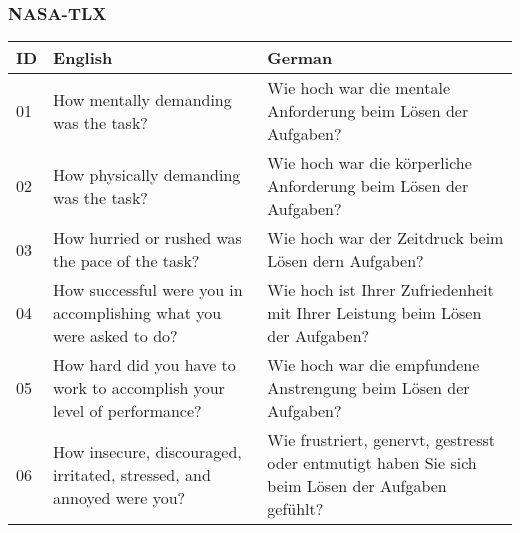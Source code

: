 \endgroup

\clearpage
\subsubsection*{NASA-TLX}

\begingroup
\setlength{\tabcolsep}{12pt}
\renewcommand{\arraystretch}{1.5}

\begin{table}[ht]
\begin{tabularx}{\textwidth}{l|X|X}
    \textbf{ID} & \textbf{English} & \textbf{German} \\
    \hline
    01 & How mentally demanding was the task? & Wie hoch war die mentale Anforderung beim Lösen der Aufgaben? \\
    02 & How physically demanding was the task? & Wie hoch war die körperliche Anforderung beim Lösen der Aufgaben? \\
    03 & How hurried or rushed was the pace of the task? & Wie hoch war der Zeitdruck beim Lösen dern Aufgaben? \\
    04 & How successful were you in accomplishing what you were asked to do? & Wie hoch ist Ihrer Zufriedenheit mit Ihrer Leistung beim Lösen der Aufgaben? \\
    05 & How hard did you have to work to accomplish your level of performance? & Wie hoch war die empfundene Anstrengung beim Lösen der Aufgaben? \\
    06 & How insecure, discouraged, irritated, stressed, and annoyed were you? & Wie frustriert, genervt, gestresst oder entmutigt haben Sie sich beim Lösen der Aufgaben gefühlt? \\
\end{tabularx}
\end{table}

\endgroup

